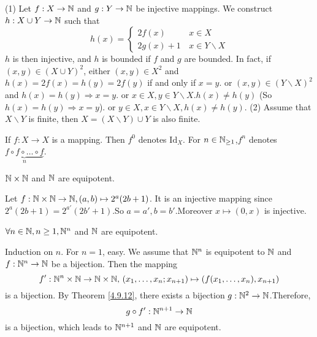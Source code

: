 \documentclass{book}
\numberwithin{equation}{section}
\begin{document}
\begin{proofenv}
    \quad
    \newline
    (1) Let $f:X\rightarrow \NN$ and $g:Y\rightarrow \NN$ be injective mappings. We construct $h:X\cup Y\rightarrow \NN$ such that 
    $$h(x)=\left\{\begin{matrix}
     2f(x)\, &x\in X\\
    2g(x)+1\,&x\in Y\backslash X

    \end{matrix}\right.$$
    $h$ is then injective, and $h$ is bounded if $f$ and $g$ are bounded.
    \newline
    In fact, if $(x,y)\in (X\cup Y)^2$,
    \newline
    either $(x,y)\in X^2$ and $h(x)=2f(x)=h(y)=2f(y)$ if and only if $x=y$.
    \newline
    or $(x,y)\in (Y\backslash X)^2$ and $h(x)=h(y)\Rightarrow x=y$.
    \newline
    or $x\in X,y\in Y\backslash X.h(x)\not=h(y)$ (So $h(x)=h(y)\Rightarrow x=y$).
    \newline
    or $y\in X,x\in Y\backslash X ,h(x)\not=h(y)$.
    \newline
    (2)  Assume that $X\backslash Y$ is finite, then $X=(X\backslash Y)\cup Y$ is also finite.
\end{proofenv}
\begin{notationenv}
    If $f:X\rightarrow X$  is a mapping. Then $f^0$ denotes $\mathrm{Id}_X$. For $n\in\NN_{\ge 1}$,$f^n$ denotes $\underset{n}{\underbrace{f\circ f\circ \dots \circ f}}$. 
\end{notationenv}
\begin{theoremenv}\label{4.9.12}
    $\NN\times\NN$ and $\NN$ are equipotent.
\end{theoremenv}
\begin{proofenv}
    Let $f:\NN\times\NN\rightarrow \NN,(a,b)\mapsto2^a(2b+1)$. It is an injective mapping since $2^a(2b+1)=2^{a'}(2b'+1)$.So $a=a',b=b'$.Moreover $x\mapsto(0,x)$ is injective.
\end{proofenv}
\begin{corollaryenv}
    $\forall n\in \NN, n\ge 1,\NN^n$ and $\NN$ are equipotent.
\end{corollaryenv}
\begin{proofenv}
    Induction on $n$.
    \newline
    For $n=1$, easy. We assume that $\NN^n$ is equipotent to $\NN$ and $f:\NN^n\rightarrow\NN$ be a bijection. Then the mapping
    $$f':\NN^n\times \NN\rightarrow \NN\times\NN,\,\left(x_1,\dots,x_n;x_{n+1}\right)\mapsto\left(f(x_1,\dots,x_n),x_{n+1}\right)$$ 
    is a bijection. By Theorem \ref{4.9.12}, there exists a bijection $g:\NN^2\rightarrow\NN$.Therefore,
    $$g\circ f':\NN^{n+1}\rightarrow\NN$$
    is a bijection, which leads to $\NN^{n+1}$ and $\NN$ are equipotent.
\end{proofenv}
\end{document}
